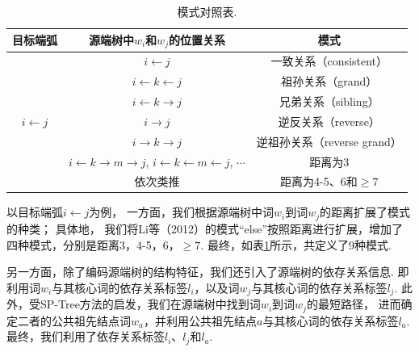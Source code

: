\begin{table}[hb]
    \centering
    \caption{模式对照表. }
    \label{tb:pattern_table}
    \begin{tabular}{c|cc}
        \hline
        目标端弧                          & 源端树中$w_i$和$w_j$的位置关系                                                                     & 模式                        \\
        \hline
        \multirow{7}{*}{$i \leftarrow j$} & $i \leftarrow j$                                                                                   & 一致关系（consistent）      \\
                                          & $i \leftarrow k \leftarrow j$                                                                      & 祖孙关系（grand）           \\
                                          & $i \leftarrow k \rightarrow j$                                                                     & 兄弟关系（sibling）         \\
                                          & $i \rightarrow j$                                                                                  & 逆反关系（reverse）         \\
                                          & $i \rightarrow k \rightarrow j$                                                                    & 逆祖孙关系（reverse grand） \\
                                          & $i \leftarrow k \rightarrow m \rightarrow j$, $i \leftarrow k \leftarrow m \leftarrow j$, $\cdots$ & 距离为3                     \\
                                          & 依次类推                                                                                           & 距离为4-5、6和$\geq 7$      \\
        \hline
    \end{tabular}
\end{table}

以目标端弧$i \leftarrow j$为例，
一方面，我们根据源端树中词$w_i$到词$w_j$的距离扩展了模式的种类；
具体地， 我们将Li等（2012）\cite{li2012exploiting}的模式“else”按照距离进行扩展，增加了四种模式，分别是距离3，4-5，6，$\geq 7$. 最终，如表\ref{tb:pattern_table}所示，共定义了9种模式.

另一方面，除了编码源端树的结构特征，我们还引入了源端树的依存关系信息.
即利用词$w_i$与其核心词的依存关系标签$l_i$，以及词$w_j$与其核心词的依存关系标签$l_j$.
此外，受SP-Tree方法的启发，我们在源端树中找到词$w_i$到词$w_j$的最短路径，
进而确定二者的公共祖先结点词$w_a$，并利用公共祖先结点$a$与其核心词的依存关系标签$l_a$.
最终，我们利用了依存关系标签$l_i$、$l_j$和$l_a$.

